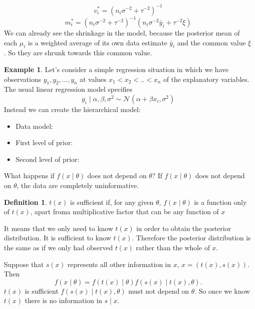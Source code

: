 \documentclass[lecture,12pt,]{pcms-l}
\numberwithin{section}{chapter}
\numberwithin{equation}{chapter}
\theoremstyle{plain}
\theoremstyle{definition}
\newtheorem{example}{Example}[section]
\theoremstyle{definition}
\newtheorem{definition}[equation]{Definition}
\begin{document}
\begin{equation}
v_{i}^* =(n_i \sigma^{-2}+\tau^{-2})^{-1}
\end{equation}
\begin{equation}
m_{i}^* =(n_i \sigma^{-2}+\tau^{-2})^{-1}(n_i \sigma^{-2}\bar{y}_i + \tau^{-2} \xi)
\end{equation}
We can already see the shrinkage in the model, because the posterior mean of each $\mu_i$ is a weighted average of its own data estimate $\bar{y}_i$ and the common value $\xi$. So they are shrunk towards this common value. 
\begin{example}
Let's consider a simple regression situation in which we have observations $y_1,y_2,...,y_n$ at values $x_1<x_2<..<x_n$ of the explanatory variables. The usual linear regression model specifies
\begin{equation}
y_i \mid \alpha, \beta, \sigma^2 \sim \mathcal{N}(\alpha + \beta x_i, \sigma^2)
\end{equation}
Instead we can create the hierarchical model:
\begin{itemize}
\item Data model:
\item First level of prior:
\item Second level of prior:
\end{itemize}
\end{example}
What happens if $f(x \mid \theta)$ does not depend on $\theta$? If $f(x \mid \theta)$ does not depend on $\theta$, the data are completely uninformative. 
\begin{definition}
$t(x)$ is sufficient if, for any given $\theta$, $f(x \mid \theta)$ is a function only of $t(x)$, apart froma multiplicative factor that can be any function of $x$
\end{definition}

It means that we only need to know $t(x)$ in order to obtain the posterior distribution. It is sufficient to know $t(x)$. Therefore the posterior distribution is the same as if we only had observed $t(x)$ rather than the whole of $x$. 

Suppose that $s(x)$ represents all other information in $x$, $x=(t(x),s(x))$. Then 
\begin{equation}
f(x \mid \theta)=f(t(x) \mid \theta)f(s(x)\mid t(x), \theta).
\end{equation}
$t(x)$ is sufficient $f(s(x)\mid t(x), \theta)$ must not depend on $\theta$. So once we know $t(x)$ there is no information in $s \mid x$.
\end{document}
